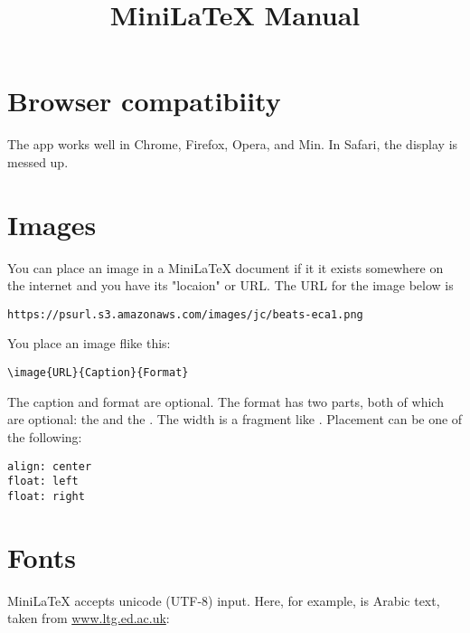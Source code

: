 \title{MiniLaTeX Manual}

\maketitle

\tableofcontents


\section{Browser compatibiity}

The app works well in Chrome, Firefox, Opera, and Min.   In Safari, the display is messed up.

\section{Images}

You can place an image in a MiniLaTeX document if it it exists somewhere on the internet and you have its "locaion" or URL.  The URL for the image below is

\begin{verbatim}
https://psurl.s3.amazonaws.com/images/jc/beats-eca1.png
\end{verbatim}

You place an image flike this:

\begin{verbatim}
\image{URL}{Caption}{Format}
\end{verbatim}

The caption and format are optional.  The format has two parts, both of which are optional: the  and the . The width is a fragment like .  Placement can be one of the following:

\begin{verbatim}
align: center
float: left
float: right
\end{verbatim}


\section{Fonts}

MiniLaTeX accepts unicode (UTF-8) input.  Here, for example, is Arabic text,  taken from \href{https://www.ltg.ed.ac.uk/~richard/unicode-sample.html}{www.ltg.ed.ac.uk}:

